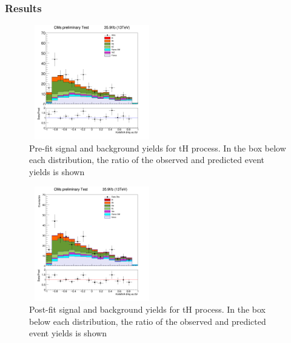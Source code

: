 \documentclass[11pt]{beamer}
\begin{document}
\begin{frame}
\frametitle{Results}
\begin{minipage}{0.4\textwidth}
	\begin{center}
	\begin{figure}
		\includegraphics[width=5.5cm,height=5cm]{figures/kin.png}
		\caption*{\tiny{Pre-fit signal and background yields for tH process. In the
			box below each distribution, the ratio of the observed and predicted event yields is shown}}
	\end{figure}
\end{center}
\end{minipage}\hfill \quad
\begin{minipage}{0.4\textwidth}
	\begin{center}
	\begin{figure}
		\includegraphics[width=5.5cm,height=5cm]{figures/simple.png}
		\caption*{\tiny{Post-fit signal and background yields for tH process. In the
			box below each distribution, the ratio of the observed and predicted event yields is shown}}
	\end{figure}
\end{center}
\end{minipage}
\end{frame}
\end{document}
